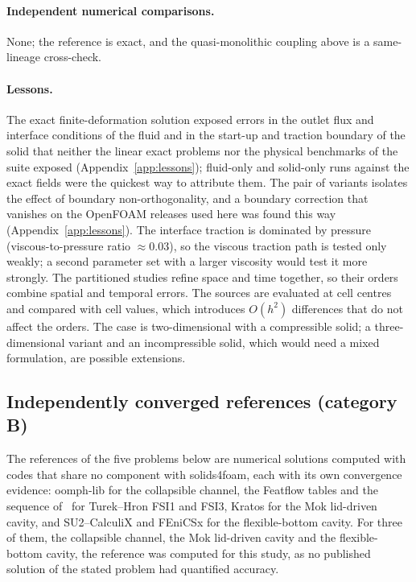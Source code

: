 \paragraph{Independent numerical comparisons.}
None; the reference is exact, and the quasi-monolithic coupling above is a same-lineage cross-check.

\paragraph{Lessons.}
The exact finite-deformation solution exposed errors in the outlet flux and interface conditions of the fluid and in the start-up and traction boundary of the solid that neither the linear exact problems nor the physical benchmarks of the suite exposed (Appendix~\ref{app:lessons}); fluid-only and solid-only runs against the exact fields were the quickest way to attribute them.
The pair of variants isolates the effect of boundary non-orthogonality, and a boundary correction that vanishes on the OpenFOAM releases used here was found this way (Appendix~\ref{app:lessons}).
The interface traction is dominated by pressure (viscous-to-pressure ratio $\approx0.03$), so the viscous traction path is tested only weakly; a second parameter set with a larger viscosity would test it more strongly.
The partitioned studies refine space and time together, so their orders combine spatial and temporal errors.
The sources are evaluated at cell centres and compared with cell values, which introduces $O(h^2)$ differences that do not affect the orders.
The case is two-dimensional with a compressible solid; a three-dimensional variant and an incompressible solid, which would need a mixed formulation, are possible extensions.


\subsection{Independently converged references (category B)}\label{sec:independent_refs}

The references of the five problems below are numerical solutions computed with codes that share no component with solids4foam, each with its own convergence evidence: oomph-lib for the collapsible channel, the Featflow tables and the sequence of~\citet{Failer2020} for Turek--Hron FSI1 and FSI3, Kratos for the Mok lid-driven cavity, and SU2--CalculiX and FEniCSx for the flexible-bottom cavity.
For three of them, the collapsible channel, the Mok lid-driven cavity and the flexible-bottom cavity, the reference was computed for this study, as no published solution of the stated problem had quantified accuracy.

